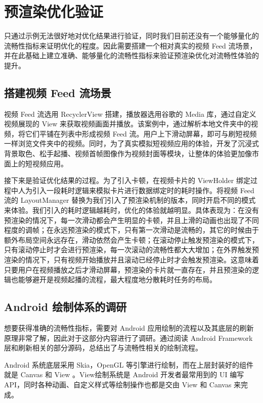 \chapter{预渲染优化验证}

只通过示例无法很好地对优化结果进行验证，同时我们目前还没有一个能够量化的流畅性指标来证明优化的程度。因此需要搭建一个相对真实的视频 Feed 流场景，并在此基础上建立准确、能够量化的流畅性指标来验证预渲染优化对流畅性体验的提升。

\section{搭建视频 Feed 流场景}

视频 Feed 流选用 RecyclerView 搭建，播放器选用谷歌的 Media 库，通过自定义视频展现的 View 来获取视频画面并播放。该案例中，通过解析本地文件夹中的视频，将它们平铺在列表中形成视频 Feed 流。用户上下滑动屏幕，即可与刷短视频一样浏览文件夹中的视频。同时，为了真实模拟短视频应用的体验，开发了沉浸式背景取色、松手起播、视频首帧图像作为视频封面等模块，让整体的体验更加像市面上的短视频应用。

接下来是验证优化结果的过程。为了引入卡顿，在视频卡片的 ViewHolder 绑定过程中人为引入一段耗时逻辑来模拟卡片进行数据绑定时的耗时操作。将视频 Feed 流的 LayoutManager 替换为我们引入了预渲染机制的版本，同时开启不同的模式来体验。我们引入的耗时逻辑越耗时，优化的体验就越明显。具体表现为：在没有预渲染的情况下，每一次滑动都会产生明显的卡顿，并且上滑的动画也出现了不同程度的调帧；在永远预渲染的模式下，只有第一次滑动是流畅的，其它的时候由于额外布局空间永远存在，滑动依然会产生卡顿；在滚动停止触发预渲染的模式下，只有滚动停止时才会进行预渲染，每一次滚动的流畅性都大大增加；在外界触发预渲染的情况下，只有视频开始播放并且滚动已经停止时才会触发预渲染。这意味着只要用户在视频播放之后才滑动屏幕，预渲染的卡片就一直存在，并且预渲染的逻辑也能够避开是视频起播的流程，最大程度地分散耗时任务的布局。

\section{Android 绘制体系的调研}

想要获得准确的流畅性指标，需要对 Android 应用绘制的流程以及其底层的刷新原理非常了解，因此对于这部分内容进行了调研。通过阅读 Android Framework 层和刷新相关的部分源码，总结出了与流畅性相关的绘制流程。

Android 系统底层采用 Skia，OpenGL 等引擎进行绘制，而在上层封装好的组件就是 Canvas 和 View \cite{tahir2013learning}。View绘制系统是 Android 开发者最常用到的 UI 编写 API，同时各种动画、自定义样式等绘制操作也都是交由 View 和 Canvas 来完成。

